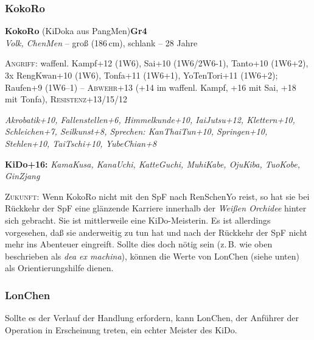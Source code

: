 \documentclass[
a4paper,
twoside,
DIV=calc,
BCOR=4mm,
fontsize=9pt,
twocolumn=on,
titlepage=on,
parskip=half
]{scrartcl}
\begin{document}
\subsubsection{KokoRo}



\textbf{KokoRo} (KiDoka aus PangMen)\hfill \textbf{Gr4}\\
\emph{Volk, ChenMen} -- groß (186\,cm), schlank -- 28 Jahre


\textsc{Angriff:} waffenl. Kampf+12 (1W6), Sai+10 (1W6/2W6-1),
Tanto+10 (1W6+2), 3x RengKwan+10 (1W6), Tonfa+11 (1W6+1), YoTenTori+11
(1W6+2); Raufen+9 (1W6--1) -- \textsc{Abwehr}+13 (+14 im
waffenl. Kampf, +16 mit Sai, +18 mit Tonfa),
\textsc{Resistenz}+13/15/12

\emph{Akrobatik+10, Fallenstellen+6, Himmelkunde+10, IaiJutsu+12,
  Klettern+10, Schleichen+7, Seilkunst+8, Sprechen: KanThaiTun+10,
  Springen+10, Stehlen+10, TaiTschi+10, YubeChian+8}

\textbf{KiDo+16:} \emph{KamaKusa, KanaUchi, KatteGuchi, MuhiKabe,
  OjuKiba, TuoKobe, GinZjang}


\textsc{Zukunft:} Wenn KokoRo nicht mit den SpF nach RenSchenYo reist,
so hat sie bei Rückkehr der SpF eine glänzende Karriere innerhalb der
\emph{Weißen Orchidee} hinter sich gebracht. Sie ist mittlerweile eine
KiDo-Meisterin. Es ist allerdings vorgesehen, daß sie anderweitig zu
tun hat und nach der Rückkehr der SpF nicht mehr ins Abenteuer
eingreift. Sollte dies doch nötig sein (z.\,B. wie oben beschrieben
als \emph{dea ex machina}), können die Werte von LonChen (siehe
unten) als Orientierungshilfe dienen.

\subsubsection{LonChen}

Sollte es der Verlauf der Handlung erfordern, kann LonChen, der
Anführer der Operation in Erscheinung treten, ein echter Meister des
KiDo.
\end{document}
